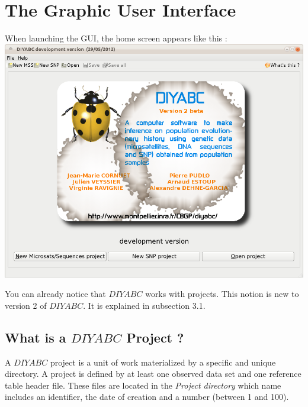 \section{The Graphic User Interface}

When launching the GUI, the home screen appears like this :\\


\includegraphics[scale=0.4]{gui_pictures/Capture-DIYABC-1.png} 

You can already notice that $DIYABC$ works with projects. This notion is new to version 2 of $DIYABC$. It is explained in subsection 3.1.

\subsection{What is a $DIYABC$ Project ?}

\label{doc_openProjectButton}
A $ DIYABC $ project is a unit of work materialized by a specific and unique directory. A project is defined by at least one observed data set and one reference table header file. These files are located in the \emph{Project directory} which name includes an identifier, the date of creation and a number (between 1 and 100).\\

